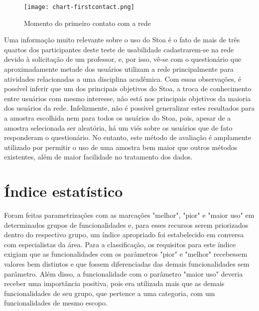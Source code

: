 \begin{figure}[!h]
  \centering
  \texttt{[image: chart-firstcontact.png]} 
  \caption{Momento do primeiro contato com a rede}
  \label{fig:chart-firstcontact} 
\end{figure}
Uma informação muito relevante sobre o uso do Stoa é o fato de mais de três quartos dos participantes deste teste de usabilidade cadastrarem-se na rede devido à solicitação de um professor, e, por isso, vê-se com o questionário que aproximadamente metade dos usuários utilizam a rede principalmente para atividades relacionadas a uma disciplina acadêmica. Com essas observações, é possível inferir que um dos principais objetivos do Stoa, a troca de conhecimento entre usuários com mesmo interesse, não está nos principais objetivos da maioria dos usuários da rede.
Infelizmente, não é possível generalizar estes resultados para a amostra escolhida nem para todos os usuários do Stoa, pois, apesar de a amostra selecionada ser aleatória, há um viés sobre os usuários que de fato responderam o questionário. No entanto, este método de avaliação é amplamente utilizado por permitir o uso de uma amostra bem maior que outros métodos existentes, além de maior facilidade no tratamento dos dados.


\section{Índice estatístico}
\label{sec:indice}

    Foram feitas parametrizações com as marcações "melhor", "pior"  e "maior uso"  em determinados grupos de funcionalidades e, para esses recursos serem priorizados dentro do respectivo grupo, um índice apropriado foi estabelecido em conversa com especialistas da área. Para a classificação, os requisitos para este índice exigiam que as funcionalidades com os parâmetros "pior" e "melhor" recebessem valores bem distintos e que fossem diferenciadas das demais funcionalidades sem parâmetro. Além disso, a funcionalidade com o parâmetro "maior uso" deveria receber uma importância positiva, pois era utilizada mais que as demais funcionalidades de seu grupo, que pertence a uma categoria, com um funcionalidades de mesmo escopo.
    
